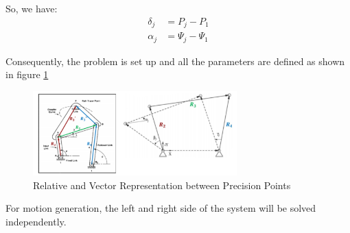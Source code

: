 \documentclass[12pt]{article}
\begin{document}
So, we have:
\begin{align}
    \delta_j&=P_j-P_1\\
    \alpha_j&=\Psi_j-\Psi_1
\end{align}

Consequently, the problem is set up and all the parameters are defined as shown in figure \ref{fig:MG_3}

\begin{figure}[h!]
    \centering
    \includegraphics[width=0.7\textwidth]{MG_3.png}
    \caption{Relative and Vector Representation between Precision Points}
    \label{fig:MG_3}
\end{figure}
For motion generation, the left and right side of the system will be solved independently.
\end{document}

